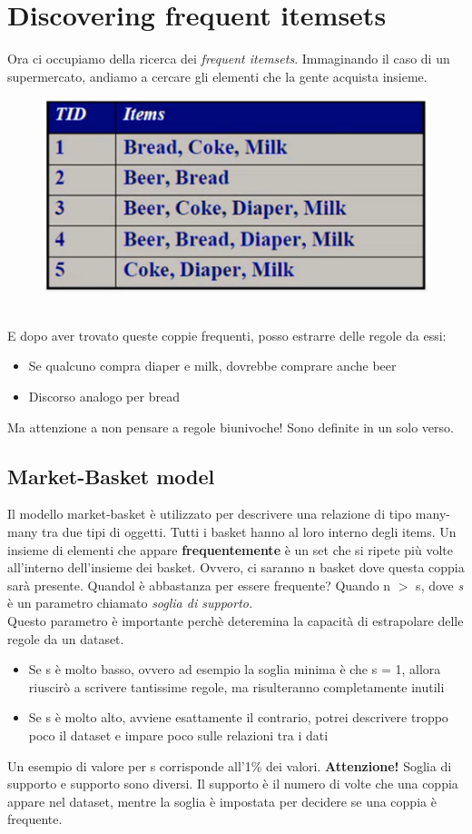 \section{Discovering frequent itemsets}
Ora ci occupiamo della ricerca dei \textit{frequent itemsets}. Immaginando il caso di un supermercato, andiamo a cercare gli elementi che la gente acquista insieme. 
\\
\begin{figure}[th]
    \centering
    \includegraphics[scale=0.60]{FrequentItems/img/frq_itm.png}
\end{figure}
\\
E dopo aver trovato queste coppie frequenti, posso estrarre delle regole da essi:
\begin{itemize}
    \item Se qualcuno compra diaper e milk, dovrebbe comprare anche beer
    \item Discorso analogo per bread
\end{itemize}
Ma attenzione a non pensare a regole biunivoche! Sono definite in un solo verso. 

\subsection{Market-Basket model}
Il modello market-basket è utilizzato per descrivere una relazione di tipo many-many tra due tipi di oggetti. Tutti i basket hanno al loro interno degli items. Un insieme di elementi che appare \textbf{frequentemente} è un set che si ripete più volte all'interno dell'insieme dei basket. Ovvero, ci saranno n basket dove questa coppia sarà presente. Quandol è abbastanza per essere frequente? Quando n $>$ s, dove \textit{s} è un parametro chiamato \textit{soglia di supporto.}
\\
Questo parametro è importante perchè deteremina la capacità di estrapolare delle regole da un dataset. 
\begin{itemize}
    \item Se s è molto basso, ovvero ad esempio la soglia minima è che s = 1, allora riuscirò a scrivere tantissime regole, ma risulteranno completamente inutili
    \item Se s è molto alto, avviene esattamente il contrario, potrei descrivere troppo poco il dataset e impare poco sulle relazioni tra i dati
\end{itemize}
Un esempio di valore per s corrisponde all'1\% dei valori. \textbf{Attenzione!} Soglia di supporto e supporto sono diversi. Il supporto è il numero di volte che una coppia appare nel dataset, mentre la soglia è impostata per decidere se una coppia è frequente. 
